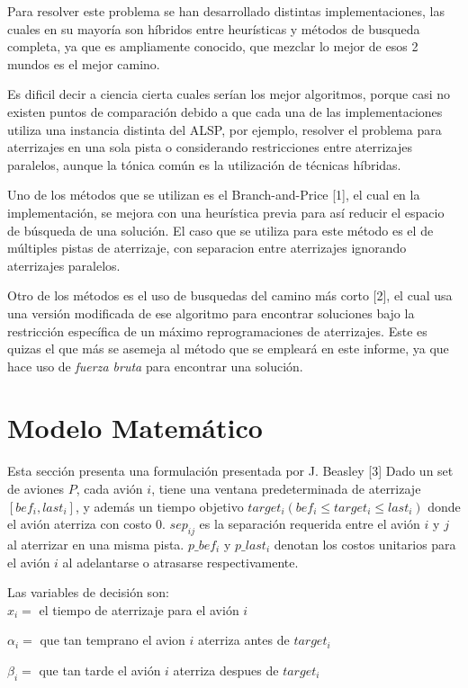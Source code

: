 \documentclass[letter, 11pt]{article}
\begin{document}
Para resolver este problema se han desarrollado distintas implementaciones, las cuales en su mayoría son híbridos entre heurísticas y métodos de busqueda completa, ya que es ampliamente conocido, que mezclar lo mejor de esos 2 mundos es el mejor camino.

Es dificil decir a ciencia cierta cuales serían los mejor algoritmos, porque casi no existen puntos de comparación debido a que cada una de las implementaciones utiliza una instancia distinta del ALSP, por ejemplo, resolver el problema para aterrizajes en una sola pista o considerando restricciones entre aterrizajes paralelos, aunque la tónica común es la utilización de técnicas híbridas.

Uno de los métodos que se utilizan es el Branch-and-Price [1], el cual en la implementación, se mejora con una heurística previa para así reducir el espacio de búsqueda de una solución. El caso que se utiliza para este método es el de múltiples pistas de aterrizaje, con separacion entre aterrizajes ignorando aterrizajes paralelos.

Otro de los métodos es el uso de busquedas del camino más corto [2], el cual usa una versión modificada de ese algoritmo para encontrar soluciones bajo la restricción específica de un máximo reprogramaciones de aterrizajes. Este es quizas el que más se asemeja al método que se empleará en este informe, ya que hace uso de \textit{fuerza bruta} para encontrar una solución.


\section{Modelo Matem\'atico}
Esta sección presenta una formulación presentada por J. Beasley [3]
Dado un set de aviones $P$, cada avión $i$, tiene una ventana predeterminada de aterrizaje $[bef_i,last_i]$, y además un tiempo objetivo $target_i (bef_i \leq target_i \leq last_i)$ donde el avión aterriza con costo 0. $sep_{ij}$ es la separación requerida entre el avión $i$ y $j$ al aterrizar en una misma pista.
$p\_bef_i$ y $p\_last_i$ denotan los costos unitarios para el avión $i$ al adelantarse o atrasarse respectivamente.

Las variables de decisión son:
\\

$x_i = $ el tiempo de aterrizaje para el avión $i$

$\alpha_i = $ que tan temprano el avion $i$ aterriza antes de $target_i$

$\beta_i = $ que tan tarde el avión $i$ aterriza despues de $target_i$
\end{document}
